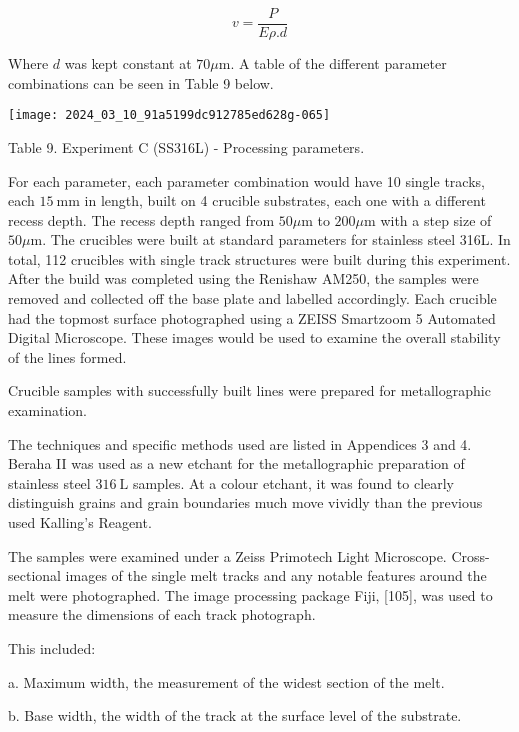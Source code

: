 \documentclass[10pt]{article}
\begin{document}
\begin{equation*}
v=\frac{P}{E \rho . d} \tag{8}
\end{equation*}


Where $d$ was kept constant at $70 \mu \mathrm{m}$. A table of the different parameter combinations can be seen in Table 9 below.

\begin{center}
\texttt{[image: 2024\_03\_10\_91a5199dc912785ed628g-065]}
\end{center}

Table 9. Experiment C (SS316L) - Processing parameters.

For each parameter, each parameter combination would have 10 single tracks, each $15 \mathrm{~mm}$ in length, built on 4 crucible substrates, each one with a different recess depth. The recess depth ranged from $50 \mu \mathrm{m}$ to $200 \mu \mathrm{m}$ with a step size of $50 \mu \mathrm{m}$. The crucibles were built at standard parameters for stainless steel 316L. In total, 112 crucibles with single track structures were built during this experiment. After the build was completed using the Renishaw AM250, the samples were removed and collected off the base plate and labelled accordingly. Each crucible had the topmost surface photographed using a ZEISS Smartzoom 5 Automated Digital Microscope. These images would be used to examine the overall stability of the lines formed.

Crucible samples with successfully built lines were prepared for metallographic examination.

The techniques and specific methods used are listed in Appendices 3 and 4. Beraha II was used as a new etchant for the metallographic preparation of stainless steel $316 \mathrm{~L}$ samples. At a colour etchant, it was found to clearly distinguish grains and grain boundaries much move vividly than the previous used Kalling's Reagent.

The samples were examined under a Zeiss Primotech Light Microscope. Cross-sectional images of the single melt tracks and any notable features around the melt were photographed. The image processing package Fiji, [105], was used to measure the dimensions of each track photograph.

This included:

a. Maximum width, the measurement of the widest section of the melt.

b. Base width, the width of the track at the surface level of the substrate.
\end{document}
